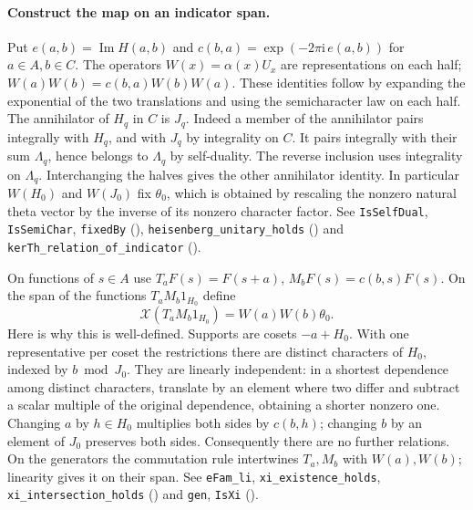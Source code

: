 \paragraph{Construct the map on an indicator span.}
Put \(e(a,b)=\operatorname{Im}H(a,b)\) and
\(c(b,a)=\exp(-2\pi\mathrm i\,e(a,b))\) for \(a\in A,b\in C\).
The operators \(W(x)=\alpha(x)U_x\) are representations on each half;
\(W(a)W(b)=c(b,a)W(b)W(a)\). These identities follow by expanding
the exponential of the two translations and using the semicharacter
law on each half. The annihilator of \(H_q\) in \(C\) is \(J_q\).
Indeed a member of the annihilator pairs integrally with \(H_q\), and
with \(J_q\) by integrality on \(C\). It pairs integrally with their
sum \(\Lambda_q\), hence belongs to \(\Lambda_q\) by self-duality.
The reverse inclusion uses integrality on \(\Lambda_q\). Interchanging
the halves gives the other annihilator identity. In particular
\(W(H_0)\) and \(W(J_0)\) fix \(\theta_0\), which is obtained by
rescaling the nonzero natural theta vector by the inverse of its
nonzero character factor. See \nolinkurl{IsSelfDual},
\nolinkurl{IsSemiChar}, \nolinkurl{fixedBy}
(),
\nolinkurl{heisenberg_unitary_holds}
() and
\nolinkurl{kerTh_relation_of_indicator}
().

On functions of \(s\in A\) use \(T_a F(s)=F(s+a)\),
\(M_bF(s)=c(b,s)F(s)\). On the span of the functions
\(T_aM_b1_{H_0}\) define
\[
 \mathcal X(T_aM_b1_{H_0})=W(a)W(b)\theta_0 .
\]
Here is why this is well-defined. Supports are cosets \(-a+H_0\).
With one representative per coset the restrictions there are distinct
characters of \(H_0\), indexed by \(b\bmod J_0\). They are linearly
independent: in a shortest dependence among distinct characters,
translate by an element where two differ and subtract a scalar
multiple of the original dependence, obtaining a shorter nonzero one.
Changing \(a\) by \(h\in H_0\) multiplies both sides by \(c(b,h)\);
changing \(b\) by an element of \(J_0\) preserves both sides.
Consequently there are no further relations. On the generators the
commutation rule intertwines \(T_a,M_b\) with \(W(a),W(b)\);
linearity gives it on their span. See \nolinkurl{eFam_li},
\nolinkurl{xi_existence_holds}, \nolinkurl{xi_intersection_holds}
()
and \nolinkurl{gen}, \nolinkurl{IsXi}
().

